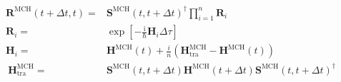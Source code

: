 \documentclass{article}
\newcommand{\I}{\ensuremath{\mathrm{i}}}
\renewcommand{\vec}[1]{\ensuremath{\mathbf{#1}}}
\begin{document}
\begin{align}
  \vec{R}^{\text{MCH}}(t+\Delta t,t)=&
  \vec{S}^{\text{MCH}}(t,t+\Delta t)^\dagger\prod\limits_{i=1}^{n}
  \vec{R}_i\nonumber\\
  \vec{R}_i=&
  \exp\left[
      -\frac{\I}{\hbar}\vec{H}_i\Delta\tau
  \right]\nonumber\\
  \vec{H}_i=&
  \vec{H}^{\text{MCH}}(t) + \frac{i}{n}
  \left(
    \vec{H}^{\text{MCH}}_{\text{tra}}
    -\vec{H}^{\text{MCH}}(t)
  \right)\nonumber\\\
  \vec{H}^{\text{MCH}}_{\text{tra}}=&
    \vec{S}^{\text{MCH}}(t,t+\Delta t)
    \vec{H}^{\text{MCH}}(t+\Delta t)
    \vec{S}^{\text{MCH}}(t,t+\Delta t)^\dagger
\nonumber\end{align}
\end{document}
